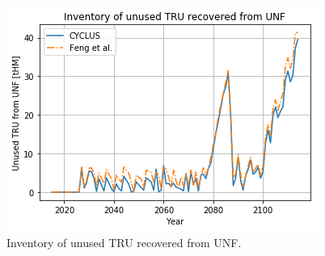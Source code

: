\begin{figure}[htbp!]
	\begin{center}
		\includegraphics[scale=0.5]{./images/results_18/tru.png}
	\end{center}
        \caption{Inventory of unused \gls{TRU} recovered from \gls{UNF}.}
	\label{fig:tru}
\end{figure}

